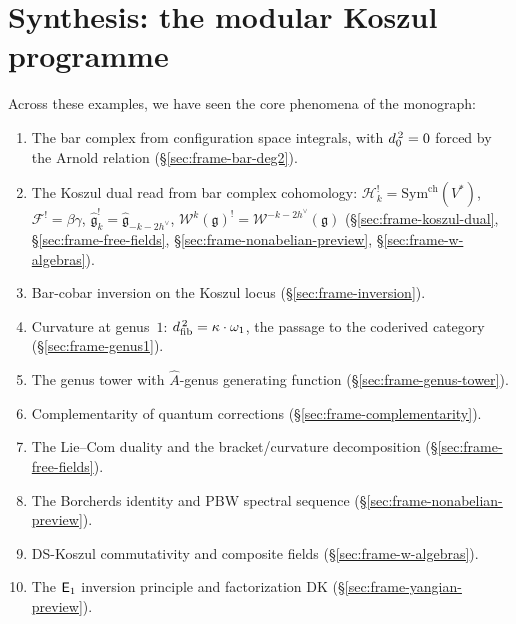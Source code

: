 \section{Synthesis: the modular Koszul programme}
\label{sec:frame-programme}

Across these examples, we have seen the core phenomena of the
monograph:
\begin{enumerate}
\item The bar complex from configuration space integrals,
  with $d_0^{\,2} = 0$ forced by the Arnold relation
  (\S\ref{sec:frame-bar-deg2}).

\item The Koszul dual read from bar complex cohomology:
  $\mathcal{H}_k^! = \mathrm{Sym}^{\mathrm{ch}}(V^*)$,
  $\mathcal{F}^! = \beta\gamma$,
  $\widehat{\mathfrak{g}}_k^! = \widehat{\mathfrak{g}}_{-k-2h^\vee}$,
  $\mathcal{W}^k(\mathfrak{g})^! = \mathcal{W}^{-k-2h^\vee}(\mathfrak{g})$
  (\S\ref{sec:frame-koszul-dual},
   \S\ref{sec:frame-free-fields},
   \S\ref{sec:frame-nonabelian-preview},
   \S\ref{sec:frame-w-algebras}).

\item Bar-cobar inversion on the Koszul locus
  (\S\ref{sec:frame-inversion}).

\item Curvature at genus~$1$: $d_{\mathrm{fib}}^{\,2} = \kappa \cdot \omega_1$,
  the passage to the coderived category
  (\S\ref{sec:frame-genus1}).

\item The genus tower with $\hat{A}$-genus generating function
  (\S\ref{sec:frame-genus-tower}).

\item Complementarity of quantum corrections
  (\S\ref{sec:frame-complementarity}).

\item The Lie--Com duality and the bracket/curvature decomposition
  (\S\ref{sec:frame-free-fields}).

\item The Borcherds identity and PBW spectral sequence
  (\S\ref{sec:frame-nonabelian-preview}).

\item DS-Koszul commutativity and composite fields
  (\S\ref{sec:frame-w-algebras}).

\item The $\mathsf{E}_1$ inversion principle and factorization DK
  (\S\ref{sec:frame-yangian-preview}).
\end{enumerate}

